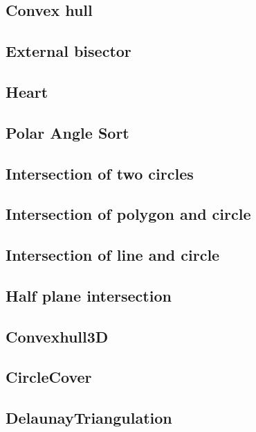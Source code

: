 \subsection{Convex hull}

\subsection{External bisector}

\subsection{Heart}

\subsection{Polar Angle Sort}

\subsection{Intersection of two circles}

\subsection{Intersection of polygon and circle}

\subsection{Intersection of line and circle}

\subsection{Half plane intersection}

\subsection{Convexhull3D}

\subsection{CircleCover}

\subsection{DelaunayTriangulation}

